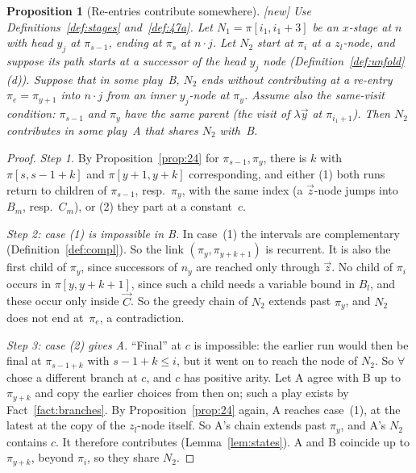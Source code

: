 \documentclass[11pt]{article}
\newcommand{\suc}[2]{#1{\cdot}#2}
\newcommand{\iv}[2]{\pi[#1,#2]}
\newcommand{\New}{\textsf{[new]}}
\theoremstyle{plain}
\newtheorem{proposition}[theorem]{Proposition}
\theoremstyle{definition}
\theoremstyle{remark}
\begin{document}
\begin{proposition}[Re-entries contribute somewhere]\label{prop:reentry}
\New{} Use Definitions~\ref{def:stages}
and~\ref{def:47a}.  Let $N_1=\iv{i_1}{i_1+3}$ be an $x$-stage at $n$ with
head $y_j$ at $\pi_{s-1}$, ending at $\pi_s$ at $\suc nj$.  Let $N_2$
start at $\pi_i$ at a $z_l$-node, and suppose its path starts at a
successor of the head $y_j$ node (Definition~\ref{def:unfold}(d)).
Suppose that in some play~B, $N_2$ ends without contributing at a
re-entry $\pi_e=\pi_{y+1}$ into $\suc nj$ from an inner $y_j$-node at
$\pi_y$.  Assume also the \emph{same-visit} condition: $\pi_{s-1}$ and
$\pi_y$ have the same parent (the visit of $\lambda\vec y$ at
$\pi_{i_1+1}$).  Then $N_2$ contributes in some play~A that shares $N_2$
with~B.
\end{proposition}
\begin{proof}
\emph{Step 1.} By Proposition~\ref{prop:24} for $\pi_{s-1},\pi_y$, there
is $k$ with $\iv s{s-1+k}$ and $\iv{y+1}{y+k}$ corresponding, and
either (1) both runs return to children of $\pi_{s-1}$, resp.\ $\pi_y$,
with the same index (a $\vec z$-node jumps into $B_m$, resp.\ $C_m$), or
(2) they part at a constant~$c$.

\emph{Step 2: case (1) is impossible in B.}  In case~(1) the intervals
are complementary (Definition~\ref{def:compl}).  So the link
$(\pi_y,\pi_{y+k+1})$ is recurrent.  It is also the first child of
$\pi_y$, since successors of $n_y$ are reached only through $\vec z$.
No child of $\pi_i$ occurs in $\iv y{y+k+1}$, since such a child needs a
variable bound in $B_l$, and these occur only inside $\vec C$.  So the
greedy chain of $N_2$ extends past $\pi_y$, and $N_2$ does not end
at~$\pi_e$, a contradiction.

\emph{Step 3: case (2) gives A.}  ``Final'' at $c$ is impossible: the
earlier run would then be final at $\pi_{s-1+k}$ with $s-1+k\le i$, but
it went on to reach the node of $N_2$.  So $\forall$ chose a different
branch at $c$, and $c$ has positive arity.  Let A agree with B up to
$\pi_{y+k}$ and copy the earlier choices from then on; such a play exists
by Fact~\ref{fact:branches}.  By Proposition~\ref{prop:24} again, A
reaches case~(1), at the latest at the copy of the $z_l$-node itself.
So A's chain extends past $\pi_y$, and A's $N_2$ contains $c$.  It
therefore contributes (Lemma~\ref{lem:states}).  A and B coincide up to
$\pi_{y+k}$, beyond $\pi_i$, so they share $N_2$.
\end{proof}
\end{document}
